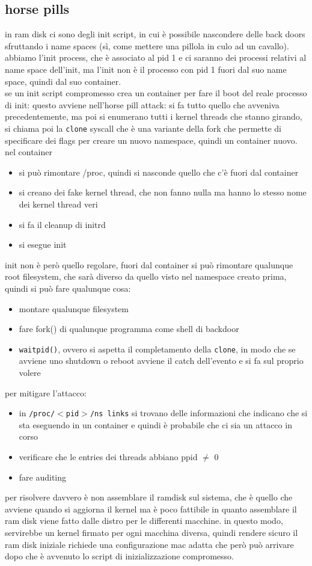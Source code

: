 \documentclass[12pt, oneside]{extbook} %
\begin{document}
\subsection{horse pills}
in ram disk ci sono degli init script, in cui è possibile nascondere delle back doors sfruttando i name spaces (sì, come mettere una pillola in culo ad un cavallo). abbiamo l'init process, che è associato al pid 1 e ci saranno dei processi relativi al name space dell'init, ma l'init non è il processo con pid 1 fuori dal suo name space, quindi dal suo container.\\se un init script compromesso crea un container per fare il boot del reale processo di init: questo avviene nell'horse pill attack: si fa tutto quello che avveniva precedentemente, ma poi si enumerano tutti i kernel threads che stanno girando, si chiama poi la \texttt{clone} syscall che è una variante della fork che permette di specificare dei flags per creare un nuovo namespace, quindi un container nuovo. nel container
\begin{itemize}
\item si può rimontare /proc, quindi si nasconde quello che c'è fuori dal container
\item si creano dei fake kernel thread, che non fanno nulla ma hanno lo stesso nome dei kernel thread veri
\item si fa il cleanup di initrd
\item si esegue init
\end{itemize}
init non è però quello regolare, fuori dal container si può rimontare qualunque root filesystem, che sarà diverso da quello visto nel namespace creato prima, quindi si può fare qualunque cosa:
\begin{itemize}
\item montare qualunque filesystem
\item fare fork() di qualunque programma come shell di backdoor
\item \texttt{waitpid()}, ovvero si aspetta il completamento della \texttt{clone}, in modo che se avviene uno shutdown o reboot avviene il catch dell'evento e si fa sul proprio volere
\end{itemize}
per mitigare l'attacco:
\begin{itemize}
\item in \texttt{/proc/$<$pid$>$/ns links} si trovano delle informazioni che indicano che si sta eseguendo in un container e quindi è probabile che ci sia un attacco in corso
\item verificare che le entries dei threads abbiano ppid $\neq$ 0
\item fare auditing
\end{itemize}
per risolvere davvero è non assemblare il ramdisk sul sistema, che è quello che avviene quando si aggiorna il kernel ma è poco fattibile in quanto assemblare il ram disk viene fatto dalle distro per le differenti macchine. in questo modo, servirebbe un kernel firmato per ogni macchina diversa, quindi rendere sicuro il ram disk iniziale richiede una configurazione mac adatta che però può arrivare dopo che è avvenuto lo script di inizializzazione compromesso.
\end{document}
